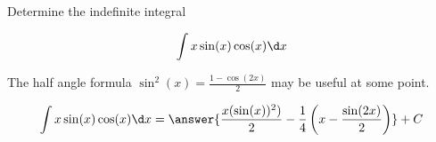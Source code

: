 \documentclass{ximera}
\author{Jason Miller}
\begin{document}
\begin{exercise}
Determine the indefinite integral 

\[
\int x\sin(x) \cos(x) \d x
\]

The half angle formula $\sin^{2}(x)= \frac{1-\cos(2x)}{2}$ may be useful at some point. 

\[
\int x \sin(x) \cos(x) \d x= \answer{  \frac{x (\sin(x))^{2})}{2} -\frac{1}{4} \left( x- \frac{ \sin(2x)}{2} \right) } + C
\]


\end{exercise}
\end{document}
